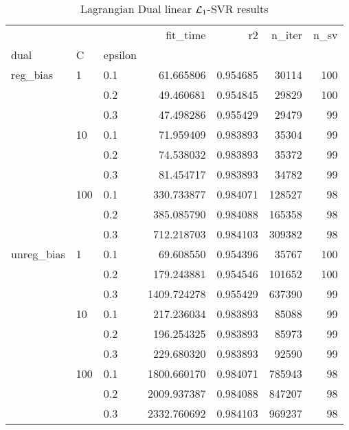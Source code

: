 \begin{table}[H]
\centering
\caption{Lagrangian Dual linear $\protect \mathcal{L}_1$-SVR results}
\label{linear_lagrangian_dual_l1_svr_cv_results}
\begin{tabular}{lllrrrr}
\toprule
           &     &     &     fit\_time &        r2 &  n\_iter &  n\_sv \\
dual & C & epsilon &              &           &         &       \\
\midrule
reg\_bias & 1   & 0.1 &    61.665806 &  0.954685 &   30114 &   100 \\
           &     & 0.2 &    49.460681 &  0.954845 &   29829 &   100 \\
           &     & 0.3 &    47.498286 &  0.955429 &   29479 &    99 \\
           & 10  & 0.1 &    71.959409 &  0.983893 &   35304 &    99 \\
           &     & 0.2 &    74.538032 &  0.983893 &   35372 &    99 \\
           &     & 0.3 &    81.454717 &  0.983893 &   34782 &    99 \\
           & 100 & 0.1 &   330.733877 &  0.984071 &  128527 &    98 \\
           &     & 0.2 &   385.085790 &  0.984088 &  165358 &    98 \\
           &     & 0.3 &   712.218703 &  0.984103 &  309382 &    98 \\
unreg\_bias & 1   & 0.1 &    69.608550 &  0.954396 &   35767 &   100 \\
           &     & 0.2 &   179.243881 &  0.954546 &  101652 &   100 \\
           &     & 0.3 &  1409.724278 &  0.955429 &  637390 &    99 \\
           & 10  & 0.1 &   217.236034 &  0.983893 &   85088 &    99 \\
           &     & 0.2 &   196.254325 &  0.983893 &   85973 &    99 \\
           &     & 0.3 &   229.680320 &  0.983893 &   92590 &    99 \\
           & 100 & 0.1 &  1800.660170 &  0.984071 &  785943 &    98 \\
           &     & 0.2 &  2009.937387 &  0.984088 &  847207 &    98 \\
           &     & 0.3 &  2332.760692 &  0.984103 &  969237 &    98 \\
\bottomrule
\end{tabular}
\end{table}
